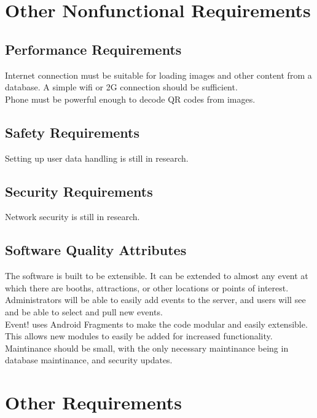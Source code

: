 \documentclass{scrreprt}
\begin{document}
\chapter{Other Nonfunctional Requirements}

\section{Performance Requirements}
Internet connection must be suitable for loading images and other content from a 
database. A simple wifi or 2G connection should be sufficient. \\
Phone must be powerful enough to decode QR codes from images.

\section{Safety Requirements}
Setting up user data handling is still in research.

\section{Security Requirements}
Network security is still in research.

\section{Software Quality Attributes}
The software is built to be extensible. It can be extended to almost any event at
which there are booths, attractions, or other locations or points of interest. \\ 
Administrators will be able to easily add events to the server, and users will see
and be able to select and pull new events. \\
Event! uses Android Fragments to make the code modular and easily extensible. 
This allows new modules to easily be added for increased functionality. \\
Maintinance should be small, with the only necessary maintinance being in 
database maintinance, and security updates. \\

\chapter{Other Requirements}
\end{document}
